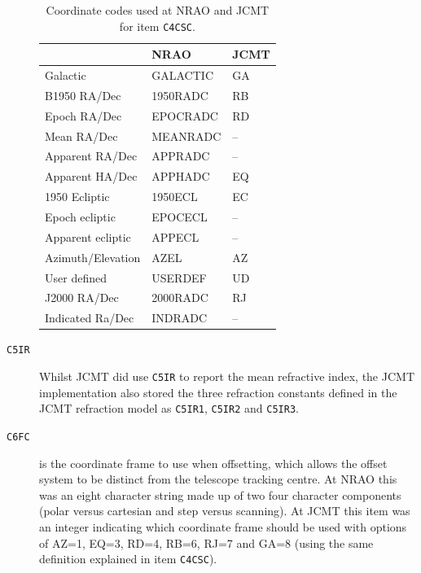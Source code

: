 \documentclass[final,authoryear,5p,times,twocolumn]{elsarticle}
\begin{document}
\begin{description}
\begin{table}
\caption{Coordinate codes used at NRAO and JCMT for item
  \texttt{C4CSC}.}
\label{tab:coordcodes}
\begin{center}
\begin{tabular}{lll}
\hline
 & NRAO & JCMT \\ \hline
Galactic & GALACTIC & GA \\
B1950 RA/Dec & 1950RADC & RB \\
Epoch RA/Dec & EPOCRADC & RD \\
Mean RA/Dec & MEANRADC & -- \\
Apparent RA/Dec & APPRADC & -- \\
Apparent HA/Dec & APPHADC & EQ \\
1950 Ecliptic & 1950ECL & EC \\
Epoch ecliptic & EPOCECL & -- \\
Apparent ecliptic & APPECL & -- \\
Azimuth/Elevation & AZEL & AZ \\
User defined & USERDEF & UD \\
J2000 RA/Dec & 2000RADC & RJ \\
Indicated Ra/Dec & INDRADC & -- \\
\hline
\end{tabular}
\end{center}
\end{table}

\item[\texttt{C5IR}] Whilst JCMT did use \texttt{C5IR} to report the
  mean refractive index, the JCMT implementation also stored the three
  refraction constants defined in the JCMT refraction model
  \citep{mtin26} as \texttt{C5IR1}, \texttt{C5IR2} and \texttt{C5IR3}.

\item[\texttt{C6FC}] is the coordinate frame to use when offsetting,
  which allows the offset system to be distinct from the telescope
  tracking centre. At NRAO this was an eight character string made up
  of two four character components (polar versus cartesian and step
  versus scanning). At JCMT this item was an integer indicating which
  coordinate frame should be used with options of AZ=1, EQ=3, RD=4,
  RB=6, RJ=7 and GA=8 (using the same definition explained in item
  \texttt{C4CSC}).


\end{description}
\end{document}
